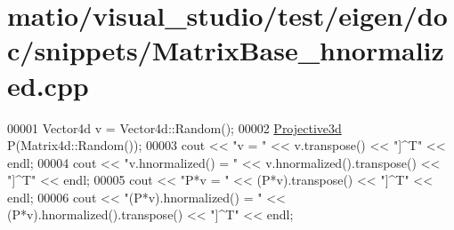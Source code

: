 \hypertarget{matio_2visual__studio_2test_2eigen_2doc_2snippets_2_matrix_base__hnormalized_8cpp_source}{}\section{matio/visual\+\_\+studio/test/eigen/doc/snippets/\+Matrix\+Base\+\_\+hnormalized.cpp}
\label{matio_2visual__studio_2test_2eigen_2doc_2snippets_2_matrix_base__hnormalized_8cpp_source}

\begin{DoxyCode}
00001 Vector4d v = Vector4d::Random();
00002 \hyperlink{group___geometry___module_gab9cec8c457da930391eb73370e07aaae}{Projective3d} P(Matrix4d::Random());
00003 cout << \textcolor{stringliteral}{"v                   = "} << v.transpose() << \textcolor{stringliteral}{"]^T"} << endl;
00004 cout << \textcolor{stringliteral}{"v.hnormalized()     = "} << v.hnormalized().transpose() << \textcolor{stringliteral}{"]^T"} << endl;
00005 cout << \textcolor{stringliteral}{"P*v                 = "} << (P*v).transpose() << \textcolor{stringliteral}{"]^T"} << endl;
00006 cout << \textcolor{stringliteral}{"(P*v).hnormalized() = "} << (P*v).hnormalized().transpose() << \textcolor{stringliteral}{"]^T"} << endl;
\end{DoxyCode}
